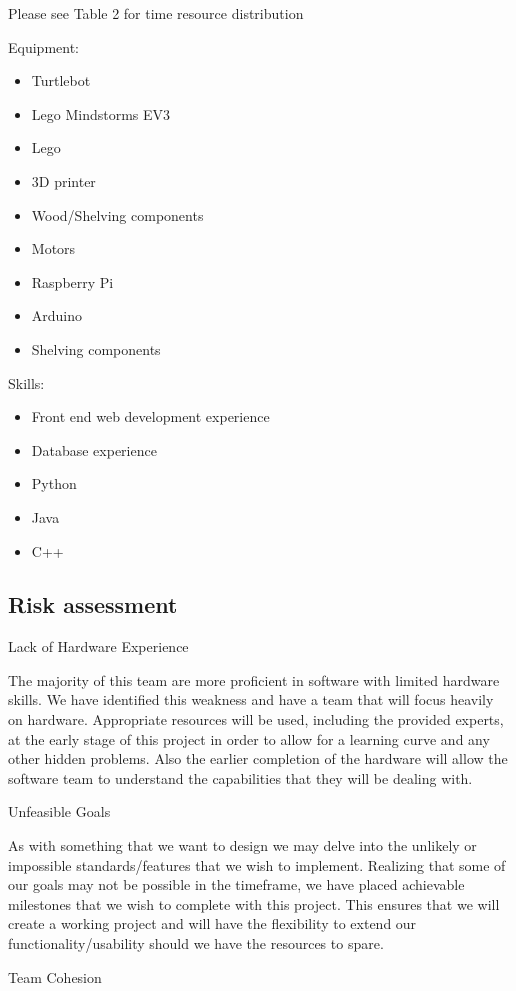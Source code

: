 \documentclass{article}
\begin{document}
Please see Table 2 for time resource distribution

Equipment: 
\begin{itemize}
\item Turtlebot
\item Lego Mindstorms EV3
\item Lego
\item 3D printer
\item Wood/Shelving components 
\item Motors
\item Raspberry Pi
\item Arduino
\item Shelving components
\end{itemize}

Skills: 
\begin{itemize}
\item Front end web development experience
\item Database experience
\item Python
\item Java
\item C++
\end{itemize}
\subsection{Risk assessment} 

Lack of Hardware Experience

The majority of this team are more proficient in software with limited hardware skills. We have identified this weakness and have a team that will focus heavily on hardware. Appropriate resources will be used, including the provided experts, at the early stage of this project in order to allow for a learning curve and any other hidden problems. Also the earlier completion of the hardware will allow the software team to understand the capabilities that they will be dealing with.

Unfeasible Goals

As with something that we want to design we may delve into the unlikely or impossible standards/features that we wish to implement. Realizing that some of our goals may not be possible in the timeframe, we have placed achievable milestones that we wish to complete with this project. This ensures that we will create a working project and will have the flexibility to extend our functionality/usability should we have the resources to spare.

Team Cohesion
\end{document}
